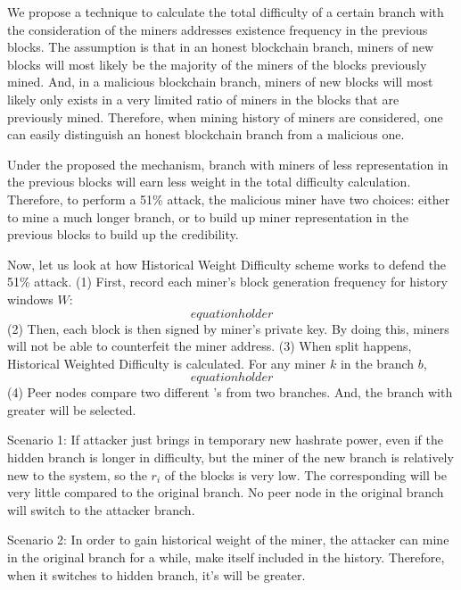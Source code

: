 \documentclass[conference]{IEEEtran}
\begin{document}
We propose a technique to calculate the total difficulty of a certain branch with the consideration of the miners addresses existence frequency in the previous blocks. The assumption is that in an honest blockchain branch, miners of new blocks will most likely be the majority of the miners of the blocks previously mined. And, in a malicious blockchain branch, miners of new blocks will most likely only exists in a very limited ratio of miners in the blocks that are previously mined. Therefore, when mining history of miners are considered, one can easily distinguish an honest blockchain branch from a malicious one.

Under the proposed the mechanism, branch with miners of less representation in the previous blocks will earn less weight in the total difficulty calculation. Therefore, to perform a 51\% attack, the malicious miner have two choices: either to mine a much longer branch, or to build up miner representation in the previous blocks to build up the credibility.

Now, let us look at how Historical Weight Difficulty scheme works to defend the 51\% attack. (1) First, record each miner’s block generation frequency for history windows $W$:
\begin{equation}
equation holder\label{eq}
\end{equation}
(2) Then, each block is then signed by miner's private key. By doing this, miners will not be able to counterfeit the miner address.
(3) When split happens, Historical Weighted Difficulty   is calculated. For any miner $k$ in the branch $b$,
\begin{equation}
equation holder\label{eq}
\end{equation}
(4) Peer nodes compare two different 's from two branches. And, the branch with greater  will be selected.

Scenario 1: If attacker just brings in temporary new hashrate power, even if the hidden branch is longer in difficulty, but the miner of the new branch is relatively new to the system, so the $r_i$ of the blocks is very low. The corresponding  will be very little compared to the original branch. No peer node in the original branch will switch to the attacker branch. 

Scenario 2: In order to gain historical weight of the miner, the attacker can mine in the original branch for a while, make itself included in the history. Therefore, when it switches to hidden branch, it’s  will be greater. 
\end{document}
